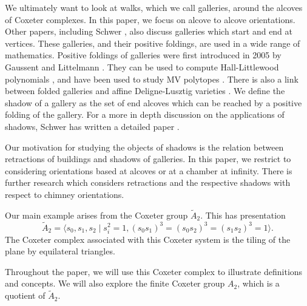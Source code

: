 \documentclass[11pt]{article}
\begin{document}
We ultimately want to look at walks, which we call galleries, around the alcoves of Coxeter complexes. In this paper, we focus on alcove to alcove orientations. Other papers, including Schwer \cite{WILD}, also discuss galleries which start and end at vertices. These galleries, and their positive foldings, are used in a wide range of mathematics. Positive foldings of galleries were first introduced in 2005 by Gaussent and Littelmann \cite{LSGAL}. They can be used to compute Hall-Littlewood polynomials \cite{HL}, and have been used to study MV polytopes \cite{MVPOLY}. There is also a link between folded galleries and affine Deligne-Lusztig varieties \cite{DEL}. We define the shadow of a gallery as the set of end alcoves which can be reached by a positive folding of the gallery. For a more in depth discussion on the applications of shadows, Schwer has written a detailed paper \cite{WILD}.

Our motivation for studying the objects of shadows is the relation between retractions of buildings and shadows of galleries. In this paper, we restrict to considering orientations based at alcoves or at a chamber at infinity. There is further research \cite{NAQVI} which considers retractions and the respective shadows with respect to chimney orientations.

 

Our main example arises from the Coxeter group $\tilde{A}_2$. This has presentation
\[\tilde{A}_2=\langle s_0,s_1,s_2\mid s_i^2=1, (s_0s_1)^3=(s_0s_2)^3=(s_1s_2)^3=1\rangle.\]
The Coxeter complex associated with this Coxeter system is the tiling of the plane by equilateral triangles. 


Throughout the paper, we will use this Coxeter complex to illustrate definitions and concepts. We will also explore the finite Coxeter group $A_2$, which is a quotient of $\tilde{A}_2$. 
\end{document}

